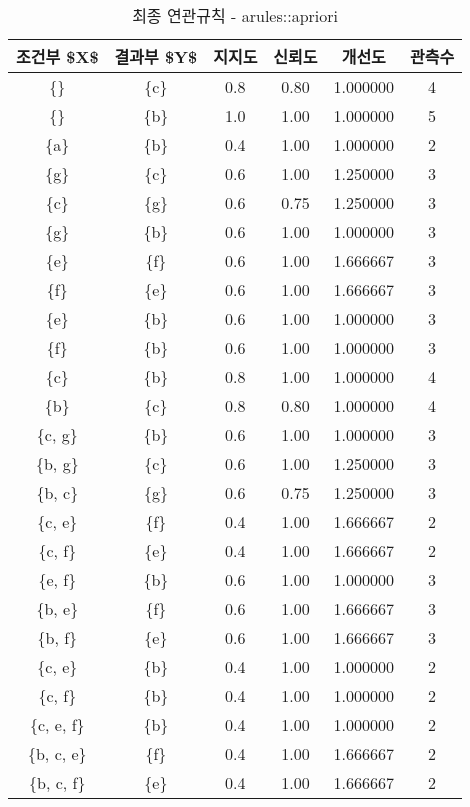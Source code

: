 \documentclass[]{book}
\begin{document}
\begin{table}[t]

\caption{\label{tab:apriori-r-results}최종 연관규칙 - arules::apriori}
\centering
\begin{tabular}{cccccc}
\toprule
조건부 \$X\$ & 결과부 \$Y\$ & 지지도 & 신뢰도 & 개선도 & 관측수\\
\midrule
\{\} & \{c\} & 0.8 & 0.80 & 1.000000 & 4\\
\{\} & \{b\} & 1.0 & 1.00 & 1.000000 & 5\\
\{a\} & \{b\} & 0.4 & 1.00 & 1.000000 & 2\\
\{g\} & \{c\} & 0.6 & 1.00 & 1.250000 & 3\\
\{c\} & \{g\} & 0.6 & 0.75 & 1.250000 & 3\\
\addlinespace
\{g\} & \{b\} & 0.6 & 1.00 & 1.000000 & 3\\
\{e\} & \{f\} & 0.6 & 1.00 & 1.666667 & 3\\
\{f\} & \{e\} & 0.6 & 1.00 & 1.666667 & 3\\
\{e\} & \{b\} & 0.6 & 1.00 & 1.000000 & 3\\
\{f\} & \{b\} & 0.6 & 1.00 & 1.000000 & 3\\
\addlinespace
\{c\} & \{b\} & 0.8 & 1.00 & 1.000000 & 4\\
\{b\} & \{c\} & 0.8 & 0.80 & 1.000000 & 4\\
\{c, g\} & \{b\} & 0.6 & 1.00 & 1.000000 & 3\\
\{b, g\} & \{c\} & 0.6 & 1.00 & 1.250000 & 3\\
\{b, c\} & \{g\} & 0.6 & 0.75 & 1.250000 & 3\\
\addlinespace
\{c, e\} & \{f\} & 0.4 & 1.00 & 1.666667 & 2\\
\{c, f\} & \{e\} & 0.4 & 1.00 & 1.666667 & 2\\
\{e, f\} & \{b\} & 0.6 & 1.00 & 1.000000 & 3\\
\{b, e\} & \{f\} & 0.6 & 1.00 & 1.666667 & 3\\
\{b, f\} & \{e\} & 0.6 & 1.00 & 1.666667 & 3\\
\addlinespace
\{c, e\} & \{b\} & 0.4 & 1.00 & 1.000000 & 2\\
\{c, f\} & \{b\} & 0.4 & 1.00 & 1.000000 & 2\\
\{c, e, f\} & \{b\} & 0.4 & 1.00 & 1.000000 & 2\\
\{b, c, e\} & \{f\} & 0.4 & 1.00 & 1.666667 & 2\\
\{b, c, f\} & \{e\} & 0.4 & 1.00 & 1.666667 & 2\\
\bottomrule
\end{tabular}
\end{table}
\end{document}
